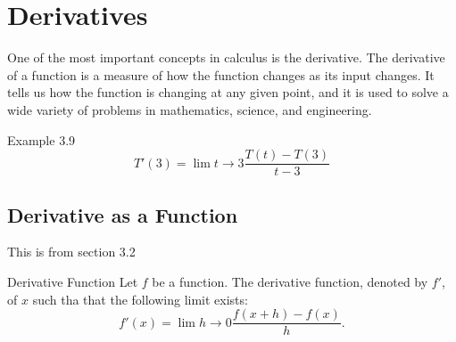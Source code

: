 \chapter{Derivatives}
One of the most important concepts in calculus is the derivative. The derivative of a function is a measure of how the function changes as its input changes. It tells us how the function is changing at any given point, and it is used to solve a wide variety of problems in mathematics, science, and engineering.

\begin{example} 
    {Example 3.9}
    \[T'(3)=\lim{t \to 3}\frac{T(t)-T(3)}{t-3}\]
\end{example}

\section{Derivative as a Function}
This is from section 3.2

\begin{definition} 
    {Derivative Function}
    Let \(f\) be a function. The derivative function, denoted by \(f'\), of \(x\) such tha that the following limit exists: 
    \[f'(x)=\lim{h \to 0} \frac{f(x+h)-f(x)}{h}.\]
\end{definition}